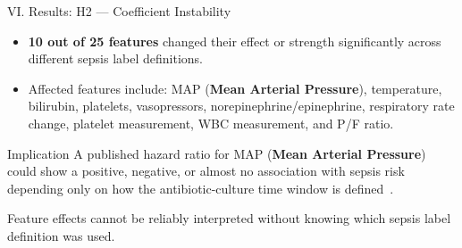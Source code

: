 \begin{frame}{VI. Results: H2 --- Coefficient Instability \confirmed}
\begin{itemize}
  \item \textbf{10 out of 25 features} changed their effect or strength
        significantly across different sepsis label definitions.
  \item Affected features include: MAP (\textbf{Mean Arterial Pressure}),
        temperature, bilirubin, platelets, vasopressors,
        norepinephrine/epinephrine, respiratory rate change, platelet
        measurement, WBC measurement, and P/F ratio.
\end{itemize}

\vspace{6pt}
\begin{block}{Implication}
  A published hazard ratio for MAP (\textbf{Mean Arterial Pressure}) could
  show a positive, negative, or almost no association with sepsis risk
  depending only on how the antibiotic-culture time window is
  defined~\cite{lauritsen2021framing}.
\end{block}

\vspace{6pt}
Feature effects cannot be reliably interpreted without knowing which sepsis
label definition was used.
\end{frame}


